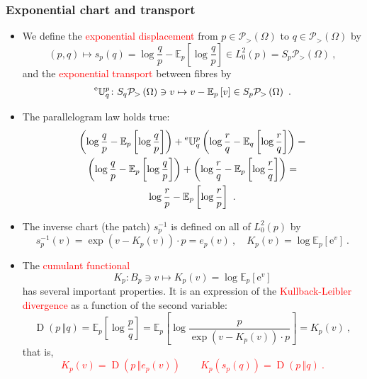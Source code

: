 \documentclass[xcolor=svgnames]{beamer}
\newcommand{\Bspaceat}[1]{L^2_0(#1)}
\newcommand{\KL}[2]{\operatorname{D}\left(#1\,\Vert#2\right)}
\newcommand{\eBspace}[1]{B_{#1}}
\newcommand{\etransport}[2]{\prescript{\text{e}}{} {\mathbb U} _ {#1} ^ {#2}}
\newcommand{\euler}{\mathrm{e}}
\newcommand{\expectat}[2]{\mathbb E_{#1}\left[#2\right]}
\newcommand{\expfibreat}[2]{S_{#1}#2}
\newcommand{\expof}[1]{\exp\left(#1\right)}
\newcommand{\opensimplexon}[1]{\mathcal P_>\left(#1\right)}
\newcommand{\rosso}[1]{\textcolor{red}{#1}}
\renewcommand{\emph}{\rosso}
\begin{document}
\begin{frame}\small\frametitle{Exponential chart and transport}

  \begin{itemize}

   \item We define the \emph{exponential displacement} from $p \in \opensimplexon \Omega$ to $q \in \opensimplexon \Omega$ by
    \begin{equation*}
(p,q) \mapsto s_p(q) = \log \frac q  p - \expectat p {\log \frac q p} \in L^2_0(p) = \expfibreat p {\opensimplexon \Omega} \ ,
    \end{equation*}
    and the \emph{exponential transport} between fibres  by
    \begin{equation*}
      \etransport q p \colon \expfibreat q {\opensimplexon \Omega} \ni v \mapsto v - \expectat p v \in \expfibreat p {\opensimplexon \Omega} \ .
    \end{equation*}
\item The parallelogram law holds true:
    \begin{multline*}
      \left(\log \frac q p - \expectat p {\log \frac q p}\right) + \etransport q p \left(\log \frac r q - \expectat q {\log \frac r q}\right) = \\   \left(\log \frac q p - \expectat p {\log \frac q p}\right) + \left(\log \frac r q - \expectat p {\log \frac r q}\right) = \\ \log \frac r p - \expectat p {\log \frac r p} \ . 
    \end{multline*}
\item The inverse chart (the patch) $s_p^{-1}$ is defined on all of $\Bspaceat p$ by
  \begin{equation*}
    s^{-1}_p(v) = \boxed{\expof{v - K_p(v)} \cdot p} = e_p(v) \ , \quad K_p(v) = \log \expectat p {\euler^v} \ .
  \end{equation*}
\item The \emph{cumulant functional}
\begin{equation*}
   K_p \colon  \eBspace p \ni v \mapsto K_p(v) = \log \expectat p {\euler^v}
\end{equation*}has several important properties. It is an expression of the \emph{Kullback-Leibler divergence} as a function of the second variable:
\begin{equation*}
    \KL p q = \expectat p {\log \frac p q} = \expectat p {\log \frac p {\expof{v - K_p(v)} \cdot p}} = K_p(v) \ ,
\end{equation*}
that is,
    \emph{\begin{equation*}
      \boxed{K_p(v) = \KL p {e_p(v)} \qquad K_p(s_p(q)) = \KL p q} \ .
    \end{equation*}}
\end{itemize}
\end{frame}
\end{document}
